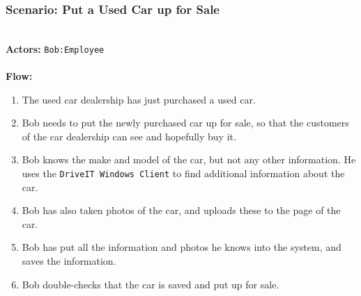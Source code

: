 \subsubsection{Scenario: Put a Used Car up for Sale}
\HRule \\[0.4cm]
\textbf{Actors:} \texttt{Bob:Employee}\\
\HRule \\[0.4cm]
\textbf{Flow:} \\
\begin{enumerate}
\item The used car dealership has just purchased a used car.
\item Bob needs to put the newly purchased car up for sale, so that the customers of the car dealership can see and hopefully buy it.
\item Bob knows the make and model of the car, but not any other information. He uses the \texttt{DriveIT Windows Client} to find additional information about the car. 
\item Bob has also taken photos of the car, and uploads these to the page of the car. 
\item Bob has put all the information and photos he knows into the system, and saves the information. 
\item Bob double-checks that the car is saved and put up for sale.
\end{enumerate}
\HRule \\[0.4cm]
